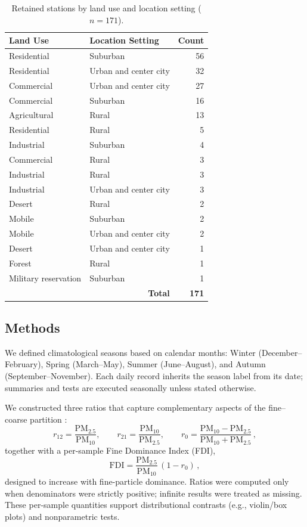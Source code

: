 \documentclass[a4paper,fleqn]{cas-sc}
\begin{document}
\begin{table}[htb]
\centering
\caption{Retained stations by land use and location setting ($n=171$).}
\label{tab:retained_counts}
\begin{tabular}{l l r}
\toprule
\textbf{Land Use} & \textbf{Location Setting} & \textbf{Count} \\
\midrule
Residential & Suburban & 56 \\
Residential & Urban and center city & 32 \\
Commercial  & Urban and center city & 27 \\
Commercial  & Suburban & 16 \\
Agricultural & Rural & 13 \\
Residential & Rural & 5  \\
Industrial  & Suburban & 4  \\
Commercial  & Rural & 3  \\
Industrial  & Rural & 3  \\
Industrial  & Urban and center city & 3  \\
Desert   & Rural & 2  \\
Mobile   & Suburban & 2  \\
Mobile   & Urban and center city & 2  \\
Desert   & Urban and center city & 1  \\
Forest   & Rural & 1  \\
Military reservation & Suburban & 1  \\
\midrule
\multicolumn{2}{r}{\textbf{Total}} & \textbf{171} \\
\bottomrule
\end{tabular}
\end{table}

\subsection{Methods}

We defined climatological seasons based on calendar months: Winter (December--February), Spring (March--May), Summer (June--August), and Autumn (September--November). Each daily record inherits the season label from its date; summaries and tests are executed seasonally unless stated otherwise.

We constructed three ratios that capture complementary aspects of the fine--coarse partition \citep{Fan2021}:
\begin{equation}
r_{12}=\frac{\mathrm{PM}_{2.5}}{\mathrm{PM}_{10}},\qquad
r_{21}=\frac{\mathrm{PM}_{10}}{\mathrm{PM}_{2.5}},\qquad
r_{0}=\frac{\mathrm{PM}_{10}-\mathrm{PM}_{2.5}}{\mathrm{PM}_{10}+\mathrm{PM}_{2.5}}\,,
\end{equation}
together with a per-sample Fine Dominance Index (FDI),
\begin{equation}
\mathrm{FDI}=\frac{\mathrm{PM}_{2.5}}{\mathrm{PM}_{10}}\,(1-r_{0})\,,
\end{equation}
designed to increase with fine-particle dominance. Ratios were computed only when denominators were strictly positive; infinite results were treated as missing. These per-sample quantities support distributional contrasts (e.g., violin/box plots) and nonparametric tests.
\end{document}
